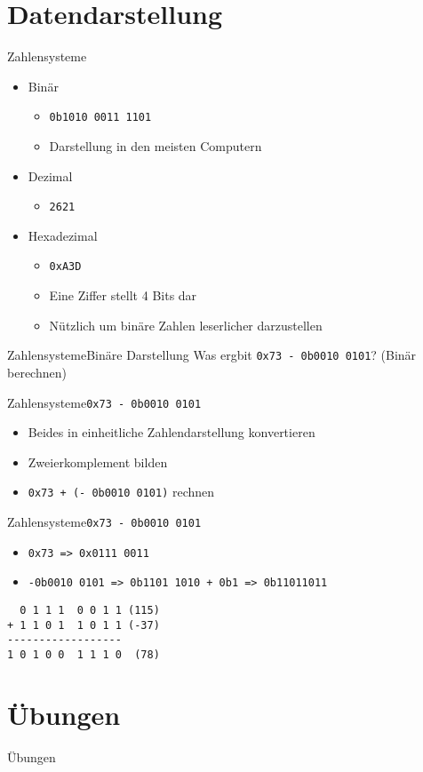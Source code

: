 \documentclass[
  german,            %
  aspectratio=169,    %
  sectionpage=false,   %
]{tumbeamer}
\begin{document}
\section{Datendarstellung}
\begin{frame}{Zahlensysteme}
	\begin{itemize}
		\item Binär
		\begin{itemize}
			\item \texttt{0b1010 0011 1101}
			\item Darstellung in den meisten Computern
		\end{itemize}
		\item Dezimal
		\begin{itemize}
			\item \texttt{2621}
		\end{itemize}
		\item Hexadezimal
		\begin{itemize}
			\item \texttt{0xA3D}
			\item Eine Ziffer stellt 4 Bits dar
			\item Nützlich um binäre Zahlen leserlicher darzustellen
		\end{itemize}
	\end{itemize}
\end{frame}
\begin{frame}{Zahlensysteme}{Binäre Darstellung}
Was ergbit \texttt{0x73 - 0b0010 0101}? (Binär berechnen)
\end{frame}
\begin{frame}{Zahlensysteme}{\texttt{0x73 - 0b0010 0101}}
\begin{itemize}
    \item Beides in einheitliche Zahlendarstellung konvertieren
    \item Zweierkomplement bilden
    \item \texttt{0x73 + (- 0b0010 0101)} rechnen 
\end{itemize}
\end{frame}
\begin{frame}[fragile]{Zahlensysteme}{\texttt{0x73 - 0b0010 0101}}
\begin{itemize}
    \item \texttt{0x73 => 0x0111 0011}
    \item \texttt{-0b0010 0101 => 0b1101 1010 + 0b1 => 0b11011011}
\end{itemize}
\begin{lstlisting}
  0 1 1 1  0 0 1 1 (115)
+ 1 1 0 1  1 0 1 1 (-37)
------------------
1 0 1 0 0  1 1 1 0  (78)
\end{lstlisting}
\end{frame}

\section{Übungen}
\begin{frame}{Übungen}
\end{frame}
\end{document}
